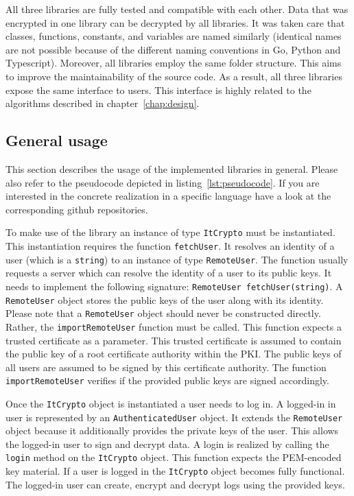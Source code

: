 \documentclass[../main.tex]{subfiles}
\begin{document}
All three libraries are fully tested and compatible with each other.
Data that was encrypted in one library can be decrypted by all libraries.
It was taken care that classes, functions, constants, and variables are named similarly (identical names are not possible because of the different naming conventions in Go, Python and Typescript).
Moreover, all libraries employ the same folder structure.
This aims to improve the maintainability of the source code.
As a result, all three libraries expose the same interface to users.
This interface is highly related to the algorithms described in chapter~\ref{chap:design}.

\subsection{General usage}

This section describes the usage of the implemented libraries in general.
Please also refer to the pseudocode depicted in listing~\ref{lst:pseudocode}.
If you are interested in the concrete realization in a specific language have a look at the corresponding github repositories.

To make use of the library an instance of type \verb|ItCrypto| must be instantiated.
This instantiation requires the function \verb|fetchUser|.
It resolves an identity of a user (which is a \verb|string|) to an instance of type \verb|RemoteUser|.
The function usually requests a server which can resolve the identity of a user to its public keys.
It needs to implement the following signature: \verb|RemoteUser fetchUser(string)|.
A \verb|RemoteUser| object stores the public keys of the user along with its identity.
Please note that a \verb|RemoteUser| object should never be constructed directly.
Rather, the \verb|importRemoteUser| function must be called.
This function expects a trusted certificate as a parameter.
This trusted certificate is assumed to contain the public key of a root certificate authority within the PKI.
The public keys of all users are assumed to be signed by this certificate authority.
The function \verb|importRemoteUser| verifies if the provided public keys are signed accordingly.

Once the \verb|ItCrypto| object is instantiated a user needs to log in.
A logged-in in user is represented by an \verb|AuthenticatedUser| object.
It extends the \verb|RemoteUser| object because it additionally provides the private keys of the user.
This allows the logged-in user to sign and decrypt data.
A login is realized by calling the \verb|login| method on the \verb|ItCrypto| object.
This function expects the PEM-encoded key material.
If a user is logged in the \verb|ItCrypto| object becomes fully functional.
The logged-in user can create, encrypt and decrypt logs using the provided keys.
\end{document}
